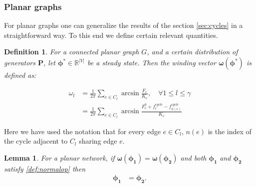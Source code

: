 \documentclass[10pt,aps,pre,preprint,superscriptaddress]{revtex4-1}
\newtheorem{defn}[thm]{Definition}
\renewcommand{\vec}[1]{\boldsymbol{#1}}
\newtheorem{lemma}{Lemma}
\begin{document}
\subsubsection{Planar graphs}
For planar graphs one can generalize the results of the section \ref{sec:cycles} in 
a straightforward way. To this end we define certain relevant quantities.  

\begin{defn}
\label{def:wvec}
For a connected planar graph $G$, and a certain distribution of generators $\vec{P}$, let $\vec{\phi^*}\in \mathbb{R}^{|V|}$ be a 
steady state.  Then the \emph{winding vector} $\vec{\omega}(\vec{\phi^*})$ is defined as:

\begin{align*}
\omega_l &= \frac{1}{2\pi} \sum_{e\in C_l} \arcsin{\frac{F_e}{K_e}}, \quad \forall 1 \leq l 
\leq \gamma\\
&=\frac{1}{2\pi} \sum_{e\in C_l} \arcsin{\frac{F_e^0+f^{cycle}_l-f^{cycle}_{n(e)}}{K_e}}
\end{align*}
\end{defn}

Here we have used the notation that for every edge $e\in C_l$, $n(e)$ is the 
index of the cycle adjacent to $C_l$ sharing edge $e$.  


\begin{lemma}
\label{lem:wind-fp-corr-planar}
For a planar network, if $\vec{\omega}(\vec{\phi_1})=\vec{\omega}(\vec{\phi_2})$ and both 
$\vec{\phi_1}$ and $\vec{\phi_2}$ satisfy \eqref{def:normalop} then 
\begin{align}
\label{}
\vec{\phi_1}&=\vec{\phi_2}. 
\end{align}
\end{lemma}
\end{document}
